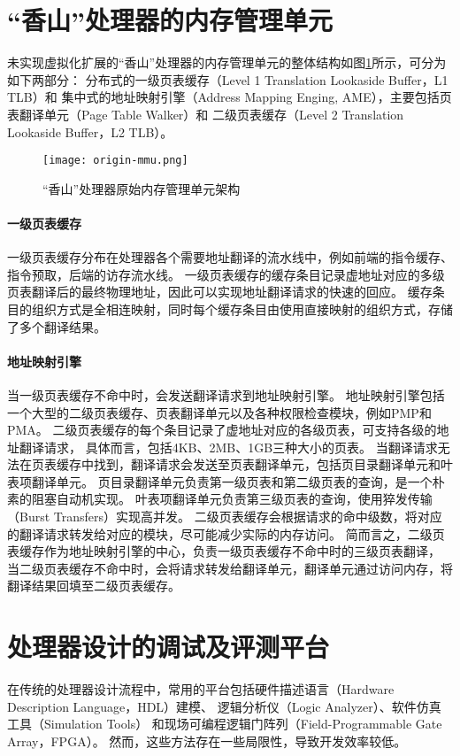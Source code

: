 \section{“香山”处理器的内存管理单元}
未实现虚拟化扩展的“香山”处理器的内存管理单元的整体结构如图\ref{fig:origin-mmu}所示，可分为如下两部分：
分布式的一级页表缓存（Level 1 Translation Lookaside Buffer，L1 TLB）和
集中式的地址映射引擎（Address Mapping Enging, AME），主要包括页表翻译单元（Page Table Walker）和
二级页表缓存（Level 2 Translation Lookaside Buffer，L2 TLB）。

\begin{figure}[htbp]
    \centering
\texttt{[image: origin-mmu.png]}
    \caption{“香山”处理器原始内存管理单元架构}
    \label{fig:origin-mmu}
\end{figure}

\paragraph{一级页表缓存} 
一级页表缓存分布在处理器各个需要地址翻译的流水线中，例如前端的指令缓存、指令预取，后端的访存流水线。
一级页表缓存的缓存条目记录虚地址对应的多级页表翻译后的最终物理地址，因此可以实现地址翻译请求的快速的回应。
缓存条目的组织方式是全相连映射，同时每个缓存条目由使用直接映射的组织方式，存储了多个翻译结果。

\paragraph{地址映射引擎} 
当一级页表缓存不命中时，会发送翻译请求到地址映射引擎。
地址映射引擎包括一个大型的二级页表缓存、页表翻译单元以及各种权限检查模块，例如PMP和PMA。
二级页表缓存的每个条目记录了虚地址对应的各级页表，可支持各级的地址翻译请求，
具体而言，包括4KB、2MB、1GB三种大小的页表。
当翻译请求无法在页表缓存中找到，翻译请求会发送至页表翻译单元，包括页目录翻译单元和叶表项翻译单元。
页目录翻译单元负责第一级页表和第二级页表的查询，是一个朴素的阻塞自动机实现。
叶表项翻译单元负责第三级页表的查询，使用猝发传输（Burst Transfers）实现高并发。
二级页表缓存会根据请求的命中级数，将对应的翻译请求转发给对应的模块，尽可能减少实际的内存访问。
简而言之，二级页表缓存作为地址映射引擎的中心，负责一级页表缓存不命中时的三级页表翻译，
当二级页表缓存不命中时，会将请求转发给翻译单元，翻译单元通过访问内存，将翻译结果回填至二级页表缓存。

\section{处理器设计的调试及评测平台}
在传统的处理器设计流程中，常用的平台包括硬件描述语言（Hardware Description Language，HDL）建模、
逻辑分析仪（Logic Analyzer）、软件仿真工具（Simulation Tools）
和现场可编程逻辑门阵列（Field-Programmable Gate Array，FPGA）。
然而，这些方法存在一些局限性，导致开发效率较低。

